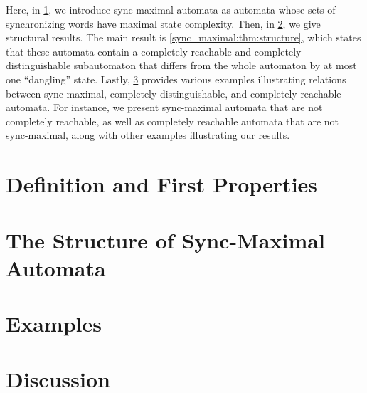 
 Here, in \cref{sync_max:sec:sync_max_aut}, we introduce sync-maximal automata as automata
 whose sets of synchronizing words have maximal state complexity.
 Then, in \cref{sync_max:sec:structure}, we give structural results.
 The main result is \cref{sync_maximal:thm:structure}, 
 which states that these automata contain
 a completely reachable and completely distinguishable subautomaton
 that differs from the whole automaton by at most one ``dangling'' state.
 Lastly, \cref{sync_max:sec:examples} provides 
 various examples illustrating 
 relations between sync-maximal, completely distinguishable, and completely reachable automata.
 For instance, we present sync-maximal automata that are not completely reachable, as well as completely reachable automata that are not sync-maximal, along with other examples illustrating our results.
 
 \section{Definition and First Properties}
\label{sync_max:sec:sync_max_aut}
	


\section{The Structure of Sync-Maximal Automata}
\label{sync_max:sec:structure}



\section{Examples} 
\label{sync_max:sec:examples}



\section{Discussion}


